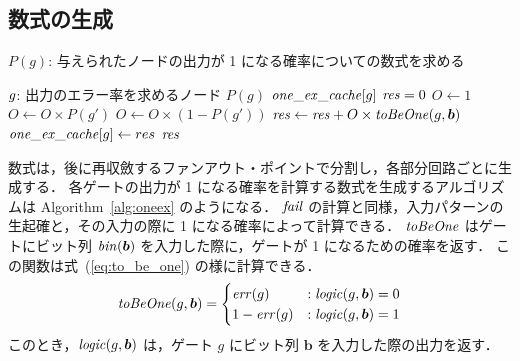 
\subsection{数式の生成}


\begin{algorithm}[tbp]
  \caption{$P(g)$: 与えられたノードの出力が 1 になる確率についての数式を求める}
  \label{alg:oneex}
  \begin{algorithmic}[1]
    \REQUIRE ${\it g}$: 出力のエラー率を求めるノード
      \RETURN{} $P(g)$
    \ENDIF
      \RETURN ${\it one\_ex\_cache}[g]$
    \ENDIF
    \STATE ${\it res} = 0$
      \STATE $O \leftarrow 1$
          \STATE $O \leftarrow O \times P(g')$ 
        \ELSE
          \STATE $O \leftarrow O \times (1 - P(g'))$ 
        \ENDIF
      \ENDFOR
      \STATE ${\it res} \leftarrow {\it res} + O \times {\it toBeOne}(g, {\bm b})$ 
    \ENDFOR
    \STATE ${\it one\_ex\_cache}[g] \leftarrow res$
    \RETURN ${\it res}$
  \end{algorithmic}
\end{algorithm}
数式は，後に再収斂するファンアウト・ポイントで分割し，各部分回路ごとに生成する．
各ゲートの出力が 1 になる確率を計算する数式を生成するアルゴリズムは Algorithm~\ref{alg:oneex} のようになる．
${\it fail}$ の計算と同様，入力パターンの生起確と，その入力の際に 1 になる確率によって計算できる．
${\it toBeOne}$ はゲートにビット列 ${\it bin}({\bm b})$ を入力した際に，ゲートが 1 になるための確率を返す．
この関数は式~(\ref{eq:to_be_one}) の様に計算できる．
\begin{eqnarray}
  {\it toBeOne}(g, {\bm b}) = \begin{cases}
    {\it err}(g) & : {\it logic}(g, {\bm b}) = 0 \\
    1 - {\it err}(g) & : {\it logic}(g, {\bm b}) = 1
  \end{cases} \label{eq:to_be_one}
\end{eqnarray}
このとき，${\it logic}(g, {\bm b})$ は，ゲート $g$ にビット列 ${\bm b}$ を入力した際の出力を返す．

